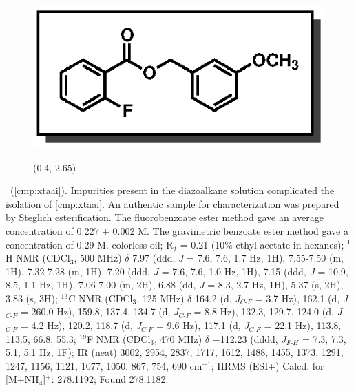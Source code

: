 \pagebreak
\begin{figure}
  \vspace{-18pt}
  \begin{center}
    \includegraphics[scale=0.8]{chp_asymmetric/images/xtaai}
          \begin{textblock}{1}(0.4,-2.65)  \end{textblock}
  \end{center}
  \vspace{-35pt}
\end{figure}\noindent \textbf{\CMPxtaai}\ (\ref{cmp:xtaai}). Impurities present in the diazoalkane solution complicated the
isolation of \ref{cmp:xtaai}. An authentic sample for characterization was
prepared by Steglich esterification. The fluorobenzoate
ester method gave an average concentration of 0.227 $\pm$ 0.002 M. The
gravimetric benzoate ester method gave a concentration of 0.29 M. colorless oil;
R$_f$ = 0.21 (10\% ethyl acetate in hexanes); $^1$H NMR (CDCl$_3$, 500 MHz) $\delta$
7.97 (ddd, \textit{J} = 7.6, 7.6, 1.7 Hz, 1H), 7.55-7.50 (m, 1H), 7.32-7.28 (m,
1H), 7.20 (ddd, \textit{J} = 7.6, 7.6, 1.0 Hz, 1H), 7.15 (ddd, \textit{J} =
10.9, 8.5, 1.1 Hz, 1H), 7.06-7.00 (m, 2H), 6.88 (dd, \textit{J} = 8.3, 2.7 Hz,
1H), 5.37 (s, 2H), 3.83 (s, 3H); $^{13}$C NMR (CDCl$_3$, 125 MHz) $\delta$ 164.2
(d, \textit{J}$_{C\mbox{-}F}$ = 3.7 Hz), 162.1 (d, \textit{J}$_{C\mbox{-}F}$ =
260.0 Hz), 159.8, 137.4, 134.7 (d, \textit{J}$_{C\mbox{-}F}$ = 8.8 Hz), 132.3,
129.7, 124.0 (d, \textit{J}$_{C\mbox{-}F}$ = 4.2 Hz), 120.2, 118.7 (d,
\textit{J}$_{C\mbox{-}F}$ = 9.6 Hz), 117.1 (d, \textit{J}$_{C\mbox{-}F}$ = 22.1
Hz), 113.8, 113.5, 66.8, 55.3; $^{19}$F NMR (CDCl$_3$, 470 MHz) $\delta$
$-$112.23 (dddd, \textit{J}$_{F\mbox{-}H}$ = 7.3, 7.3, 5.1, 5.1 Hz, 1F); IR
(neat) 3002, 2954, 2837, 1717, 1612, 1488, 1455, 1373, 1291, 1247, 1156, 1121, 1077, 1050,
867, 754, 690 cm$^{-1}$; HRMS (ESI+) Calcd. for  [M+NH$_4$]$^+$:
278.1192; Found 278.1182.

